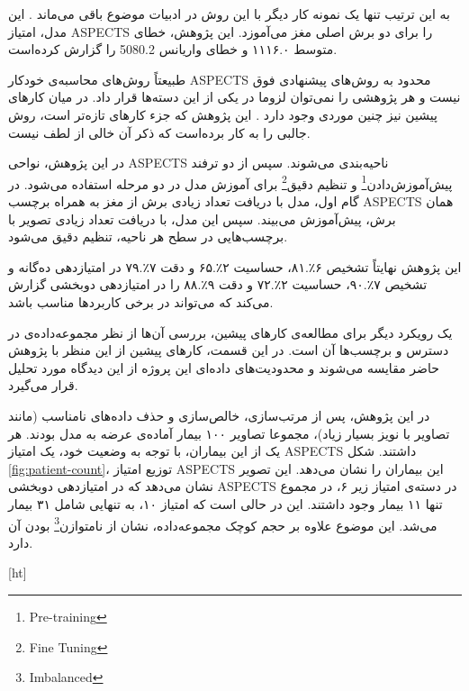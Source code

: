 به این ترتیب تنها یک نمونه کار دیگر با این روش در ادبیات موضوع باقی می‌ماند \cite{jung2018evaluating}.
این مدل، امتیاز ASPECTS را برای دو برش اصلی مغز می‌آموزد.
این پژوهش، خطای متوسط ۱۱۱۶.۰ و خطای واریانس 5080.2 را گزارش کرده‌است.

طبیعتاً روش‌های محاسبه‌ی خودکار ASPECTS محدود به روش‌های پیشنهادی فوق نیست
و هر پژوهشی را نمی‌توان لزوما در یکی از این دسته‌ها قرار داد.
در میان کارهای پیشین نیز چنین موردی وجود دارد \cite{chiang2022deep}.
این پژوهش که جزء کار‌های تازه‌تر است، روش جالبی را به کار برده‌است که ذکر آن خالی از لطف نیست.

در این پژوهش، نواحی ASPECTS ناحیه‌بندی می‌شوند.
سپس از دو ترفند 
پیش‌آموزش‌دادن\footnote{Pre-training}
و 
تنظیم دقیق\footnote{Fine Tuning}
برای آموزش مدل در دو مرحله استفاده می‌شود.
در گام اول، مدل با دریافت تعداد زیادی برش از مغز به همراه برچسب ASPECTS همان برش، پیش‌آموزش می‌بیند.
سپس این مدل، با دریافت تعداد زیادی تصویر با برچسب‌هایی در سطح هر ناحیه، تنظیم دقیق می‌شود.

این پژوهش نهایتاً تشخیص
۶٪.۸۱،
حساسیت
۲٪.۶۵
و دقت 
۷٪.۷۹
در امتیازدهی ده‌گانه و 
تشخیص
۷٪.۹۰،
حساسیت
۲٪.۷۲
و دقت 
۹٪.۸۸
را
در امتیازدهی دوبخشی 
گزارش می‌کند که می‌تواند در برخی کاربرد‌ها مناسب باشد.

یک رویکرد دیگر برای مطالعه‌ی کارهای پیشین، بررسی آن‌ها از نظر مجموعه‌داده‌ی در دسترس و برچسب‌ها آن است.
در این قسمت، کارهای پیشین از این منظر با پژوهش حاضر مقایسه می‌شوند
و
محدودیت‌های داده‌ای این پروژه از این دیدگاه مورد تحلیل قرار می‌گیرد.

در این پژوهش، پس از مرتب‌سازی، خالص‌سازی و حذف داده‌های نامناسب (مانند تصاویر با نویز بسیار زیاد)، مجموعا تصاویر ۱۰۰ بیمار آماده‌ی عرضه به مدل بودند.
هر یک از این بیماران، با توجه به وضعیت خود، یک امتیاز ASPECTS داشتند.
شکل \ref{fig:patient-count}، توزیع امتیاز ASPECTS این بیماران را نشان می‌دهد.
این تصویر نشان می‌دهد که در امتیازدهی دوبخشی ASPECTS در دسته‌ی امتیاز زیر ۶، در مجموع تنها ۱۱ بیمار وجود داشتند.
این در حالی است که امتیاز ۱۰، به تنهایی شامل ۳۱ بیمار می‌شد.
این موضوع علاوه بر حجم کوچک مجموعه‌داده، نشان از 
نامتوازن\footnote{Imbalanced} 
بودن آن دارد.


[ht]


